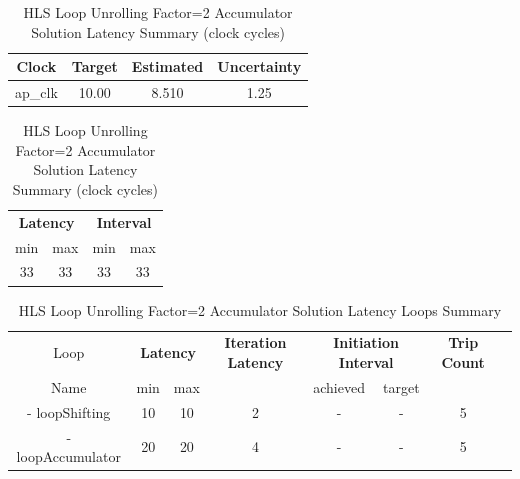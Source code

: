 \begin{table}[H]
	\centering
	\begin{minipage}[t]{0.45\linewidth}
		\centering
		\begin{tabular}{|c|c|c|c|}
			\hline
			\textbf{Clock} & \textbf{Target} & \textbf{Estimated} & \textbf{Uncertainty} \\
			\hline
			ap\_clk & 10.00 & 8.510 & 1.25 \\
			\hline
		\end{tabular}
		\caption{HLS Loop Unrolling Factor=2 Accumulator Solution Timing Summary (ns)}
		\label{tab:hls-loop-unrolling2-accumulator-solution-timing-summary}
	\end{minipage}
	\hfill
	\begin{minipage}[t]{0.45\linewidth}
		\centering
		\begin{tabular}{|c|c|c|c|}
			\hline
			\multicolumn{2}{|c|}{\textbf{Latency}} & \multicolumn{2}{|c|}{\textbf{Interval}} \\
			min & max & min & max \\
			\hline
			33 & 33 & 33 & 33 \\
			\hline
		\end{tabular}
		\caption{HLS Loop Unrolling Factor=2 Accumulator Solution Latency Summary (clock cycles)}
		\label{tab:hls-loop-unrolling2-accumulator-solution-latency-summary}
	\end{minipage}
\end{table}

\begin{table}[H]
	\centering
	\begin{tabular}{|c|c|c|c|c|c|c|c|}
		\hline
		\multicolumn{1}{|c|}{Loop} & \multicolumn{2}{|c|}{\textbf{Latency}} & \multicolumn{1}{c|}{\textbf{Iteration Latency}} & \multicolumn{2}{c|}{\textbf{Initiation Interval}} & \multicolumn{1}{c|}{\textbf{Trip Count}}  \\
		Name & min & max & & achieved & target &  \\
		\hline
		- loopShifting & 10 & 10 & 2 & - & - & 5 \\
		- loopAccumulator & 20 & 20 & 4 & - & - & 5 \\
		\hline
	\end{tabular}
	\caption{HLS Loop Unrolling Factor=2 Accumulator Solution Latency Loops Summary }
	\label{tab:hls-loop-unrolling2-accumulator-solution-loop-summary}
\end{table}

